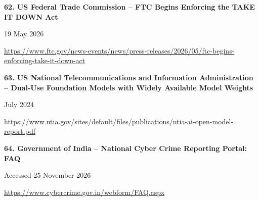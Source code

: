 \documentclass[11pt,a4paper]{article}
\begin{document}
\noindent\begin{minipage}{\linewidth}\textbf{62. US Federal Trade Commission -- FTC Begins Enforcing the TAKE IT DOWN Act}\par{\small 19 May 2026\par\url{https://www.ftc.gov/news-events/news/press-releases/2026/05/ftc-begins-enforcing-take-it-down-act}}\par
\end{minipage}\par\vspace{2mm}
\noindent\begin{minipage}{\linewidth}\textbf{63. US National Telecommunications and Information Administration -- Dual-Use Foundation Models with Widely Available Model Weights}\par{\small July 2024\par\url{https://www.ntia.gov/sites/default/files/publications/ntia-ai-open-model-report.pdf}}\par
\end{minipage}\par\vspace{2mm}
\noindent\begin{minipage}{\linewidth}\textbf{64. Government of India -- National Cyber Crime Reporting Portal: FAQ}\par{\small Accessed 25 November 2026\par\url{https://www.cybercrime.gov.in/webform/FAQ.aspx}}\par
\end{minipage}\par\vspace{2mm}
\end{document}
